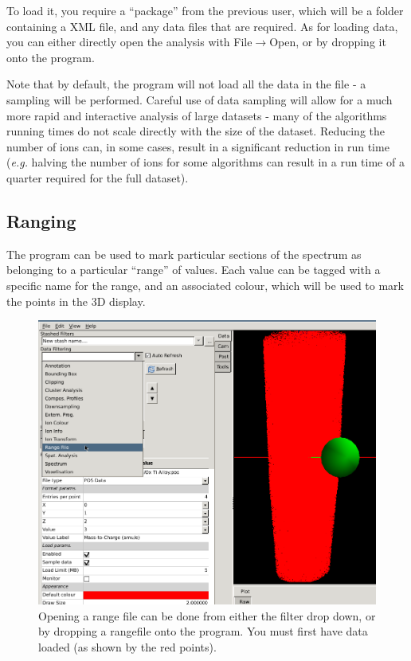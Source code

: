 \documentclass[10pt]{article}
\begin{document}
To load it, you require a ``package'' from the previous user, which will be a folder containing a XML file, and any data files that are required. As for loading data, you can either directly open the analysis with File$\rightarrow$Open, or by dropping it onto the program. 

Note that by default, the program will not load all the data in the file - a sampling will be performed. Careful use of data sampling will allow for a much more rapid and interactive analysis of large datasets - many of the algorithms running times do not scale directly with the size of the dataset. Reducing the number of ions can, in some cases, result in a significant reduction in run time (\emph{e.g.} halving the number of ions for some algorithms can result in a run time of a quarter required for the full dataset).

\subsection{Ranging}
\label{sec:quickStartRangedData}
The program can be used to mark particular sections of the spectrum as belonging to a particular ``range'' of values. Each value can be tagged with a specific name for the range, and an associated colour, which will be used to mark the points in the 3D display.

\begin{figure}[h]
\centering
 \includegraphics[width=0.85 \textwidth,keepaspectratio=true]{./figures/rangeDropdown.png}

 \caption{Opening a range file can be done from either the filter drop down, or by dropping a rangefile onto the program. You must first have data loaded (as shown by the red points).}
\label{fig:rangeDropdown}
\end{figure}
\end{document}
